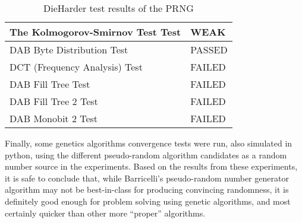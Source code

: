 \begin{table}[H]
\begin{tabular}{| l | l |}
    \hline
    The Kolmogorov-Smirnov Test Test & WEAK \\
    \hline
    DAB Byte Distribution Test & PASSED \\
    \hline
    DCT (Frequency Analysis) Test & FAILED \\
    \hline
    DAB Fill Tree Test & FAILED \\
    \hline
    DAB Fill Tree 2 Test & FAILED \\
    \hline
    DAB Monobit 2 Test & FAILED \\
    \hline
  \end{tabular}
  \caption{DieHarder test results of the PRNG}
  \label{testing:prng:1-time}
\end{table}


Finally, some genetics algorithms convergence tests were run, also simulated in python, using the different pseudo-random algorithm candidates as a random number source in the experiments.
Based on the results from these experiments, it is safe to conclude that, while Barricelli's pseudo-random number generator algorithm may not be best-in-class for producing convincing randomness, it is definitely good enough for problem solving using genetic algorithms, and most certainly quicker than other more ``proper'' algorithms.


